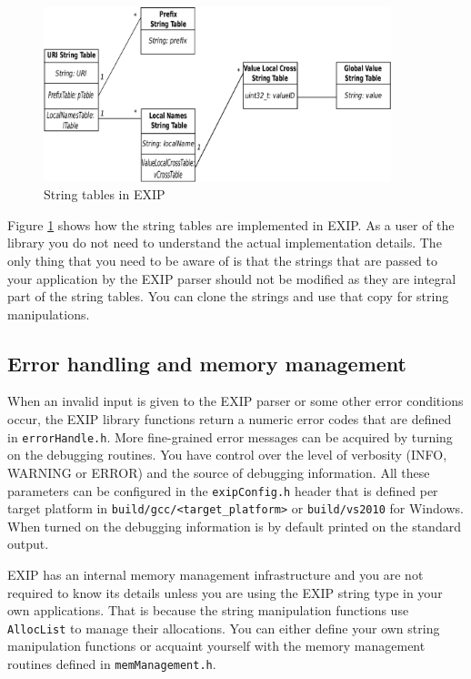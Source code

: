 \begin{figure}[h!]
 \begin{center}
 \includegraphics[width=0.90\textwidth, keepaspectratio=true]{images/StringTablesDiag.pdf}
\end{center}
\caption{String tables in EXIP}
\label{fig:EXIP-string-tables} 
\end{figure} 

Figure \ref{fig:EXIP-string-tables} shows how the string tables are implemented in EXIP. As a user of
the library you do not need to understand the actual implementation details. The only thing that you need
to be aware of is that the strings that are passed to your application by the EXIP parser should not be
modified as they are integral part of the string tables. You can clone the strings and use that copy
for string manipulations.

\subsection{Error handling and memory management}
\label{sec:errors-memory}
When an invalid input is given to the EXIP parser or some other error conditions occur, the
EXIP library functions return a numeric error codes that are defined in \texttt{errorHandle.h}.
More fine-grained error messages can be acquired by turning on the debugging routines.
You have control over the level of verbosity (INFO, WARNING or ERROR) and the source of
debugging information. All these parameters can be configured in the \texttt{exipConfig.h} header
that is defined per target platform in \texttt{build/gcc/<target\_platform>} or
\texttt{build/vs2010} for Windows.
When turned on the debugging information is by default printed on the standard output.

EXIP has an internal memory management infrastructure and you are not required to
know its details unless you are using the EXIP string type in your own applications. That is because
the string manipulation functions use \texttt{AllocList} to manage their allocations.
You can either define your own string manipulation functions or acquaint yourself with 
the memory management routines defined in \texttt{memManagement.h}.
